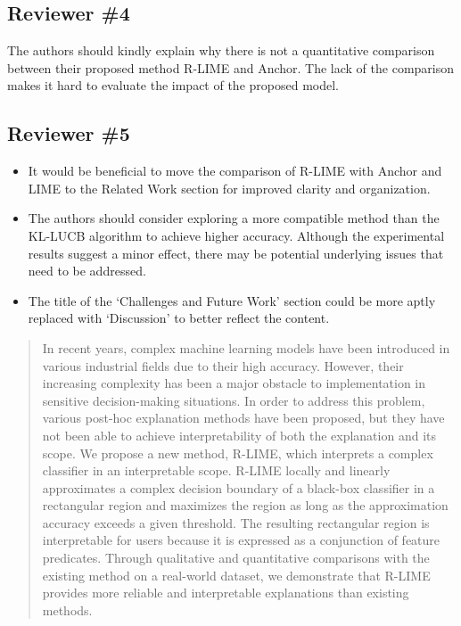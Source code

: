 \documentclass[runningheads]{llncs}
\begin{document}
\subsection*{Reviewer \#4}
The authors should kindly explain why there is not a quantitative comparison
between their proposed method R-LIME and Anchor. The lack of the comparison
makes it hard to evaluate the impact of the proposed model.

\subsection*{Reviewer \#5}
\begin{itemize}
  \setlength{\itemsep}{15pt}
  \item It would be beneficial to move the comparison of R-LIME with Anchor
        and LIME to the Related Work section for improved clarity and
        organization.
  \item The authors should consider exploring a more compatible method than the
        KL-LUCB algorithm to achieve higher accuracy. Although the experimental
        results suggest a minor effect, there may be potential underlying issues
        that need to be addressed.
  \item The title of the `Challenges and Future Work' section could be more
        aptly replaced with `Discussion' to better reflect the content.
\end{itemize}

\maketitle

\begin{abstract}
  In recent years,
  complex machine learning models have been introduced
  in various industrial fields due to their high accuracy.
  However,
  their increasing complexity has been a major obstacle to implementation
  in sensitive decision-making situations.
  In order to address this problem,
  various post-hoc explanation methods have been proposed,
  but they have not been able to achieve interpretability of
  both the explanation and its scope.
  We propose a new method, R-LIME,
  which interprets a complex classifier in an interpretable scope.
  R-LIME locally and linearly approximates a complex decision boundary
  of a black-box classifier in a rectangular region
  and maximizes the region as long as the approximation accuracy
  exceeds a given threshold.
  The resulting rectangular region is interpretable for users because it is
  expressed as a conjunction of feature predicates.
  Through qualitative and quantitative comparisons with the existing method
  on a real-world dataset,
  we demonstrate that R-LIME provides more reliable and interpretable
  explanations than existing methods.
\end{abstract}
\end{document}
